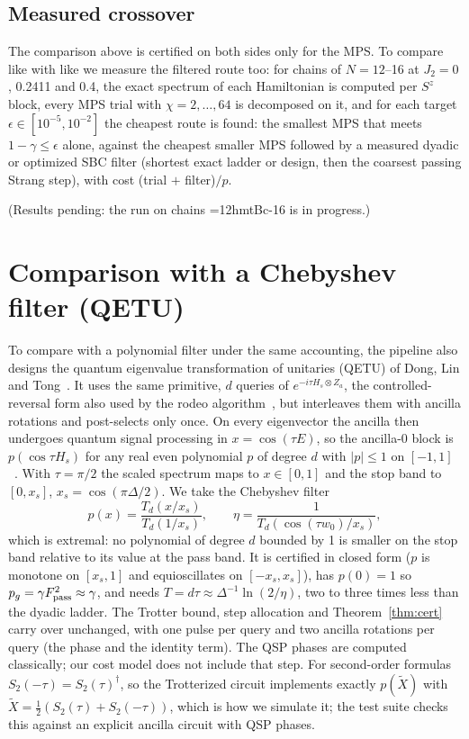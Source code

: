 \documentclass[aps,pra,twocolumn,superscriptaddress,nofootinbib]{revtex4-2}
\begin{document}
\subsection{Measured crossover}
\label{sec:crossover1d}

The comparison above is certified on both sides only for the MPS. To compare like with like we measure the
filtered route too: for chains of $N=12$--16 at $J_2=0$, 0.2411 and 0.4, the exact spectrum of each
Hamiltonian is computed per $S^z$ block, every MPS trial with $\chi=2,\dots,64$ is decomposed on it, and for
each target $\epsilon\in[10^{-5},10^{-2}]$ the cheapest route is found: the smallest MPS that meets
$1-\gamma\le\epsilon$ alone, against the cheapest smaller MPS followed by a measured dyadic or optimized SBC
filter (shortest exact ladder or design, then the coarsest passing Strang step), with cost (trial $+$
filter)$/p$.

(Results pending: the run on chains =12hmtBc-16 is in progress.)

\section{Comparison with a Chebyshev filter (QETU)}
\label{sec:qetu}

To compare with a polynomial filter under the same accounting, the pipeline also
designs the quantum eigenvalue transformation of unitaries (QETU) of Dong, Lin and Tong~\cite{Dong2022}.
It uses the same primitive, $d$ queries of $e^{-i\tau H_s\otimes Z_a}$, the controlled-reversal form
also used by the rodeo algorithm~\cite{BeeLindgren2025}, but interleaves them with ancilla rotations
and post-selects only once. On every eigenvector the ancilla then undergoes quantum signal processing in
$x=\cos(\tau E)$, so the ancilla-0 block is $p(\cos\tau H_s)$ for any real even polynomial $p$ of degree
$d$ with $|p|\le1$ on $[-1,1]$~\cite{Dong2022}. With $\tau=\pi/2$ the scaled spectrum maps to $x\in[0,1]$
and the stop band to $[0,x_s]$, $x_s=\cos(\pi\Delta/2)$. We take the Chebyshev filter
\begin{equation}
p(x)=\frac{T_d(x/x_s)}{T_d(1/x_s)},\qquad \eta=\frac1{T_d(\cos(\tau w_0)/x_s)},
\end{equation}
which is extremal: no polynomial of degree $d$ bounded by 1 is smaller on the stop band relative to its
value at the pass band. It is certified in closed form ($p$ is monotone on $[x_s,1]$ and equioscillates
on $[-x_s,x_s]$), has $p(0)=1$ so $p_g=\gamma F_{\rm pass}^2\approx\gamma$, and needs
$T=d\tau\approx\Delta^{-1}\ln(2/\eta)$, two to three times less than the dyadic ladder. The Trotter bound,
step allocation and Theorem~\ref{thm:cert} carry over unchanged, with one pulse per query and two ancilla
rotations per query (the phase and the identity term). The QSP phases are computed classically; our
cost model does not include that step. For second-order formulas $S_2(-\tau)=S_2(\tau)^\dagger$, so the
Trotterized circuit implements exactly $p(\tilde X)$ with $\tilde X=\frac12(S_2(\tau)+S_2(-\tau))$, which is
how we simulate it; the test suite checks this against an explicit ancilla circuit with QSP phases.
\end{document}
